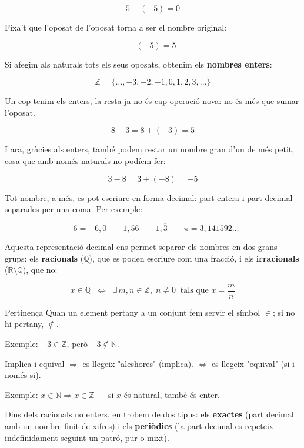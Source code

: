 \[
5 + (-5) = 0
\]

Fixa't que l'oposat de l'oposat torna a ser el nombre original:

\[
-(-5) = 5
\]

Si afegim als naturals tots els seus oposats, obtenim els \textbf{nombres enters}:

\[
\mathbb{Z} = \{\dots, -3, -2, -1, 0, 1, 2, 3, \dots\}
\]

Un cop tenim els enters, la resta ja no és cap operació nova: no és més que sumar l'oposat.

\[
8 - 3 = 8 + (-3) = 5
\]

I ara, gràcies als enters, també podem restar un nombre gran d'un de més petit, cosa que amb només naturals no podíem fer:

\[
3 - 8 = 3 + (-8) = -5
\]

Tot nombre, a més, es pot escriure en forma decimal: part entera i part decimal separades per una coma. Per exemple:

\[
-6 = -6{,}0 \qquad 1{,}56 \qquad 1{,}\overline{3} \qquad \pi = 3{,}141592\dots
\]

Aquesta representació decimal ens permet separar els nombres en dos grans grups: els \textbf{racionals} ($\mathbb{Q}$), que es poden escriure com una fracció, i els \textbf{irracionals} ($\mathbb{R}\setminus\mathbb{Q}$), que no:

\[
x \in \mathbb{Q} \;\;\Leftrightarrow\;\; \exists\, m,n \in \mathbb{Z},\; n \neq 0 \;\; \text{tals que } x=\frac{m}{n}
\]

\begin{nota}{Pertinença}
Quan un element pertany a un conjunt fem servir el símbol $\in$; si no hi pertany, $\notin$.

Exemple: $-3 \in \mathbb{Z}$, però $-3 \notin \mathbb{N}$.
\end{nota}

\begin{nota}{Implica i equival}
$\Rightarrow$ es llegeix "aleshores" (implica). $\Leftrightarrow$ es llegeix "equival" (si i només si).

Exemple: $x \in \mathbb{N} \Rightarrow x \in \mathbb{Z}$ — si $x$ és natural, també és enter.
\end{nota}

Dins dels racionals no enters, en trobem de dos tipus: els \textbf{exactes} (part decimal amb un nombre finit de xifres) i els \textbf{periòdics} (la part decimal es repeteix indefinidament seguint un patró, pur o mixt).


